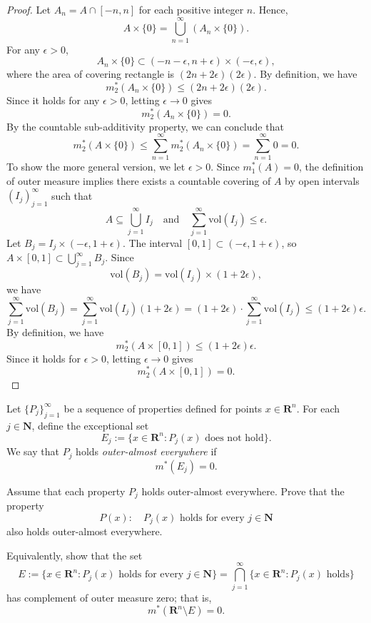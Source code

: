 \begin{proof}
    Let $A_n = A \cap [-n, n]$ for each positive integer $n$. Hence,
    \[
    A \times \{0\} = \bigcup_{n=1}^\infty (A_n \times \{0\}).
    \]
    For any $\epsilon > 0$,
    \[
    A_n \times \{0\} \subset (-n-\epsilon, n+\epsilon) \times (-\epsilon, \epsilon),
    \]
    where the area of covering rectangle is $(2n+2\epsilon)(2\epsilon)$. By definition, we have
    \[
    m_2^*(A_n \times \{0\}) \le (2n+2\epsilon)(2\epsilon).
    \]
    Since it holds for any $\epsilon > 0$, letting $\epsilon \to 0$ gives
    \[
    m_2^*(A_n \times \{0\}) = 0.
    \]
    By the countable sub-additivity property, we can conclude that
    \[
    m_2^*(A \times \{0\}) \le \sum_{n=1}^\infty m_2^*(A_n \times \{0\}) = \sum_{n=1}^\infty 0 = 0.
    \]
    To show the more general version, we let $\epsilon > 0$. Since $m_1^*(A)=0$, the definition of outer measure implies there exists a countable covering of $A$ by open intervals $(I_j)_{j=1}^\infty$ such that
    \[
    A \subseteq \bigcup_{j=1}^\infty I_j \quad \text{and} \quad \sum_{j=1}^\infty \text{vol}(I_j) \le \epsilon.
    \]
    Let $B_j=I_j \times (-\epsilon, 1+\epsilon)$. The interval $[0,1] \subset (-\epsilon, 1+\epsilon)$, so $A \times [0,1] \subset \bigcup_{j=1}^{\infty} B_j$. Since
    \[
    \text{vol}(B_j) = \text{vol}(I_j) \times (1 + 2\epsilon),
    \]
    we have
    \[
    \sum_{j=1}^\infty \text{vol}(B_j) = \sum_{j=1}^\infty \text{vol}(I_j)(1 + 2\epsilon) = (1 + 2\epsilon) \cdot \sum_{j=1}^\infty \text{vol}(I_j) \le (1 + 2\epsilon)\epsilon.
    \]
    By definition, we have
    \[
    m_2^*(A \times [0,1]) \le (1 + 2\epsilon)\epsilon.
    \]
    Since it holds for $\epsilon > 0$, letting $\epsilon \to 0$ gives
    \[
    m_2^*(A \times[0,1])=0.
    \]
\end{proof}

\begin{problem}

Let $\{P_j\}_{j=1}^\infty$ be a sequence of properties defined for points $x\in \mathbf{R}^n$. For each $j\in \mathbf{N}$, define the exceptional set
\[
E_j:=\{x\in \mathbf{R}^n : P_j(x)\text{ does not hold}\}.
\]
We say that $P_j$ holds \emph{outer-almost everywhere} if
\[
m^*(E_j)=0.
\]

Assume that each property $P_j$ holds outer-almost everywhere. Prove that the property
\[
P(x): \quad P_j(x)\text{ holds for every } j\in \mathbf{N}
\]
also holds outer-almost everywhere.

Equivalently, show that the set
\[
E:=\{x\in \mathbf{R}^n : P_j(x)\text{ holds for every }j\in \mathbf{N}\}
=\bigcap_{j=1}^\infty \{x\in \mathbf{R}^n : P_j(x)\text{ holds}\}
\]
has complement of outer measure zero; that is,
\[
m^*(\mathbf{R}^n\setminus E)=0.
\]


\end{problem}

